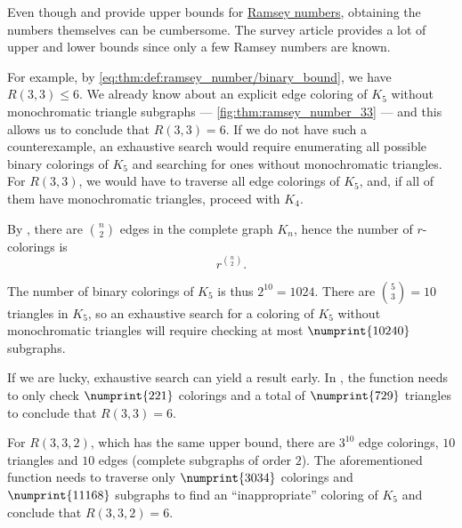 \begin{remark}\label{rem:estimating_ramsey_numbers}
  Even though  and  provide upper bounds for \hyperref[def:ramsey_number]{Ramsey numbers}, obtaining the numbers themselves can be cumbersome. The survey article \cite{Radziszowski2021SmallRamseyNumbers} provides a lot of upper and lower bounds since only a few Ramsey numbers are known.

  For example, by \eqref{eq:thm:def:ramsey_number/binary_bound}, we have \( R(3, 3) \leq 6 \). We already know about an explicit edge coloring of \( K_5 \) without monochromatic triangle subgraphs --- \cref{fig:thm:ramsey_number_33} --- and this allows us to conclude that \( R(3, 3) = 6 \). If we do not have such a counterexample, an exhaustive search would require enumerating all possible binary colorings of \( K_5 \) and searching for ones without monochromatic triangles. For \( R(3, 3) \), we would have to traverse all edge colorings of \( K_5 \), and, if all of them have monochromatic triangles, proceed with \( K_4 \).

  By , there are \( \binom n 2 \) edges in the complete graph \( K_n \), hence the number of \( r \)-colorings is
  \begin{equation*}
    r^{\binom n 2}.
  \end{equation*}

  The number of binary colorings of \( K_5 \) is thus \( 2^{10} = 1024 \). There are \( \binom 5 3 = 10 \) triangles in \( K_5 \), so an exhaustive search for a coloring of \( K_5 \) without monochromatic triangles will require checking at most \( \numprint{10 240} \) subgraphs.

  If we are lucky, exhaustive search can yield a result early. In \cite{notebook:code}, the function  needs to only check \( \numprint{221} \) colorings and a total of \( \numprint{729} \) triangles to conclude that \( R(3, 3) = 6 \).

  For \( R(3, 3, 2) \), which has the same upper bound, there are \( 3^{10} \) edge colorings, \( 10 \) triangles and \( 10 \) edges (complete subgraphs of order \( 2 \)). The aforementioned function needs to traverse only \( \numprint{3034} \) colorings and \( \numprint{11 168} \) subgraphs to find an \enquote{inappropriate} coloring of \( K_5 \) and conclude that \( R(3, 3, 2) = 6 \).


\end{remark}
